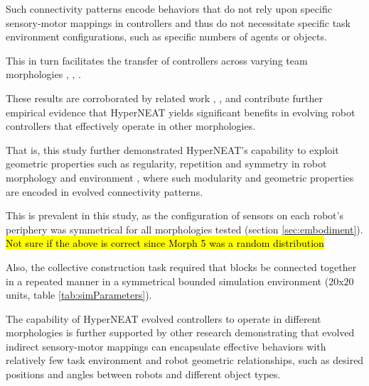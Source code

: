 Such connectivity patterns encode behaviors that do not rely upon specific sensory-motor mappings in
controllers and thus do not necessitate specific task environment configurations,
such as specific numbers of agents or objects.

This in turn facilitates the transfer of controllers across varying team morphologies
\cite{verbancsics_evolving_2010}, \cite{DidiNitschke2016SSCI}, \cite{DidiNitschke2016}.

These results are corroborated by related work \cite{RisiStanley2013}, \cite{WatsonNitschke2015SSCI},
and contribute further empirical evidence that HyperNEAT yields significant benefits in
evolving robot controllers that effectively operate in other morphologies.

That is, this study further demonstrated HyperNEAT's capability to exploit geometric properties
such as regularity, repetition and symmetry in robot morphology and environment \cite{StanleyDAmbrosioGauci2009},
where such modularity and geometric properties are encoded in evolved connectivity patterns.

This is prevalent in this study, as the configuration of sensors on each robot's periphery was
symmetrical for all morphologies tested (section \ref{sec:embodiment}).
\hl{Not sure if the above is correct since Morph 5 was a random distribution}


Also, the collective construction task required that blocks be connected together in a repeated manner in a symmetrical bounded
simulation environment ($20$x$20$ units, table \ref{tab:simParameters}).

The capability of HyperNEAT evolved controllers to operate in different morphologies is further
supported by other research \cite{verbancsics_evolving_2010}
demonstrating that evolved indirect sensory-motor mappings can
encapsulate effective behaviors with relatively few task environment and robot
geometric relationships, such as desired positions and angles between robots and different object types.

